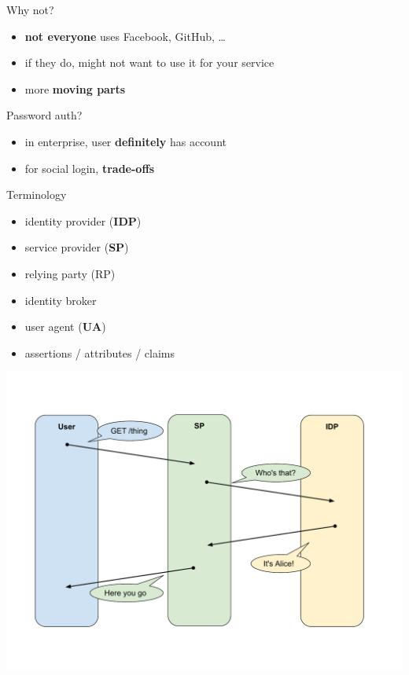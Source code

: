 \documentclass[ignorenonframetext,aspectratio=169]{beamer}
\providecommand{\tightlist}{%
  \setlength{\itemsep}{0pt}\setlength{\parskip}{0pt}}
\begin{document}
\begin{frame}{Why not?}

\begin{itemize}
\tightlist
\item
    {\bf not everyone} uses Facebook, GitHub, \ldots{}
\item
  if they do, might not want to use it for your service
\item
    more {\bf moving parts}
\end{itemize}

\end{frame}

\begin{frame}{Password auth?}

\begin{itemize}
\tightlist
\item
    in enterprise, user \textbf{definitely} has account
\item
  for social login, \textbf{trade-offs}
\end{itemize}

\end{frame}

\begin{frame}{Terminology}

\begin{itemize}
\tightlist
\item
    identity provider ({\bf IDP})
\item
    service provider ({\bf SP})
\item
    relying party (RP)
\item
  identity broker
\item
    user agent ({\bf UA})
\item
  assertions / attributes / claims
\end{itemize}

\end{frame}

\begin{frame}[plain]
\centering
\includegraphics[height=\paperheight]{fedsso-basic.pdf}
\end{frame}
\end{document}

